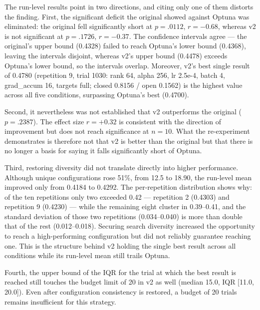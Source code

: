 The run-level results point in two directions, and citing only one of them
distorts the finding. First, the significant deficit the original showed against
Optuna was eliminated: the original fell significantly short at $p = .0112$,
$r = -0.68$, whereas v2 is not significant at $p = .1726$, $r = -0.37$. The
confidence intervals agree --- the original's upper bound (0.4328) failed to
reach Optuna's lower bound (0.4368), leaving the intervals disjoint, whereas v2's
upper bound (0.4478) exceeds Optuna's lower bound, so the intervals overlap.
Moreover, v2's best single result of 0.4780 (repetition 9, trial 1030: rank 64,
alpha 256, lr 2.5e-4, batch 4, grad\_accum 16, targets full; closed 0.8156 / open
0.1562) is the highest value across all five conditions, surpassing Optuna's best
(0.4700).

Second, it nevertheless was not established that v2 outperforms the original
($p = .2387$). The effect size $r = +0.32$ is consistent with the direction of
improvement but does not reach significance at $n = 10$. What the re-experiment
demonstrates is therefore not that v2 is better than the original but that there
is no longer a basis for saying it falls significantly short of Optuna.

Third, restoring diversity did not translate directly into higher performance.
Although unique configurations rose 51\%, from 12.5 to 18.90, the run-level mean
improved only from 0.4184 to 0.4292. The per-repetition distribution shows why:
of the ten repetitions only two exceeded 0.42 --- repetition 2 (0.4303) and
repetition 9 (0.4230) --- while the remaining eight cluster in 0.39--0.41, and
the standard deviation of those two repetitions (0.034--0.040) is more than
double that of the rest (0.012--0.018). Securing search diversity increased the
opportunity to reach a high-performing configuration but did not reliably
guarantee reaching one. This is the structure behind v2 holding the single best
result across all conditions while its run-level mean still trails Optuna.

Fourth, the upper bound of the IQR for the trial at which the best result is
reached still touches the budget limit of 20 in v2 as well (median 15.0, IQR
[11.0, 20.0]). Even after configuration consistency is restored, a budget of 20
trials remains insufficient for this strategy.

